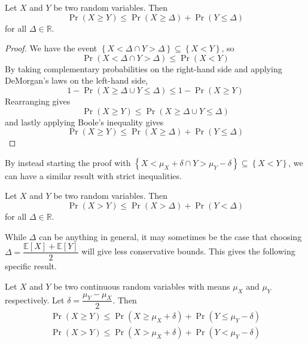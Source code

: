 \documentclass[11pt]{report} %
\begin{document}
\begin{theorem}
Let $X$ and $Y$ be two random variables. Then
\begin{equation}
\operatorname{Pr}\left(X \geq Y\right) \leq \operatorname{Pr}\left(X \geq \Delta\right) + \operatorname{Pr}\left(Y \leq \Delta\right)
\end{equation}
for all $\Delta \in \mathbb{R}$.
\end{theorem}
\begin{proof}
We have the event $\left\{X < \Delta \cap Y > \Delta\right\} \subseteq \left\{X < Y\right\}$, so
\begin{equation}
\operatorname{Pr}\left(X < \Delta \cap Y > \Delta\right) \leq \operatorname{Pr}\left(X < Y\right)
\end{equation}
By taking complementary probabilities on the right-hand side and applying DeMorgan's laws on the left-hand side,
\begin{equation}
1 - \operatorname{Pr}\left(X \geq \Delta \cup Y \leq \Delta\right) \leq 1 - \operatorname{Pr}\left(X \geq Y\right)
\end{equation}
Rearranging gives
\begin{equation}
\operatorname{Pr}\left(X \geq Y\right) \leq \operatorname{Pr}\left(X \geq \Delta \cup Y \leq \Delta\right)
\end{equation}
and lastly applying Boole's inequality gives
\begin{equation}
\operatorname{Pr}\left(X \geq Y\right) \leq \operatorname{Pr}\left(X \geq \Delta\right) + \operatorname{Pr}\left(Y \leq \Delta\right)
\end{equation}
\end{proof}
By instead starting the proof with $\left\{X < \mu_{X} + \delta \cap Y > \mu_{Y} - \delta\right\} \subseteq \left\{X <  Y\right\}$, we can have a similar result with strict inequalities.
\begin{corollary}
Let $X$ and $Y$ be two random variables. Then
\begin{equation}
\operatorname{Pr}\left(X > Y\right) \leq \operatorname{Pr}\left(X > \Delta\right) + \operatorname{Pr}\left(Y < \Delta\right)
\end{equation}
for all $\Delta \in \mathbb{R}$.
\end{corollary}
While $\Delta$ can be anything in general, it may sometimes be the case that choosing $\Delta = \dfrac{\mathbb{E}\left[X\right] + \mathbb{E}\left[Y\right]}{2}$ will give less conservative bounds. This gives the following specific result.
\begin{corollary}
Let $X$ and $Y$ be two continuous random variables with means $\mu_{X}$ and $\mu_{Y}$ respectively. Let $\delta = \dfrac{\mu_{Y} - \mu_{X}}{2}$. Then
\begin{gather}
\operatorname{Pr}\left(X \geq Y\right) \leq \operatorname{Pr}\left(X \geq \mu_{X} + \delta\right) + \operatorname{Pr}\left(Y \leq \mu_{Y} - \delta\right) \\
\operatorname{Pr}\left(X > Y\right) \leq \operatorname{Pr}\left(X > \mu_{X} + \delta\right) + \operatorname{Pr}\left(Y < \mu_{Y} - \delta\right)
\end{gather}
\end{corollary}
\end{document}
